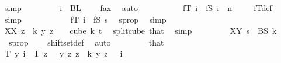 \begin{isabellebody}
\ simp\isanewline
\ \ \ \ \ \ \ \isamarkupfalse%
\ {\isachardoublequoteopen}i\ {\isasymnotin}\ BL\ {}{\isachardoublequoteclose}\ \isamarkupfalse%
\ {}\ fax{}\ \isamarkupfalse%
\ auto\isanewline
\ \ \ \ \ \ \ \isamarkupfalse%
\ \isamarkupfalse%
\ {\isachardoublequoteopen}fT\ i\ {\isacharequal}{\kern0pt}\ fS\ {\isacharparenleft}{\kern0pt}i\ {\isacharminus}{\kern0pt}\ n{\isacharparenright}{\kern0pt}{\isachardoublequoteclose}\ \isamarkupfalse%
\ {}\ \isamarkupfalse%
\ fT{\isacharunderscore}{\kern0pt}def\ \isamarkupfalse%
\ simp\isanewline
\ \ \ \ \ \ \ \isamarkupfalse%
\ \isamarkupfalse%
\ {\isacharasterisk}{\kern0pt}{\isacharasterisk}{\kern0pt}{\isacharcolon}{\kern0pt}\ {\isachardoublequoteopen}fT\ i\ {\isacharequal}{\kern0pt}\ fS\ s{\isachardoublequoteclose}\ \isamarkupfalse%
\ s{\isacharunderscore}{\kern0pt}prop\ \isamarkupfalse%
\ simp\isanewline
\isanewline
\ \ \ \ \ \ \ \isamarkupfalse%
\ XX{\isacharcolon}{\kern0pt}\ {\isachardoublequoteopen}{\isacharparenleft}{\kern0pt}{\isasymlambda}z\ {\isasymin}\ {\isacharbraceleft}{\kern0pt}{\isachardot}{\kern0pt}{\isachardot}{\kern0pt}{\isacharless}{\kern0pt}k{\isacharbraceright}{\kern0pt}{\isachardot}{\kern0pt}\ y\ {\isacharparenleft}{\kern0pt}z\ {\isacharplus}{\kern0pt}\ {}{\isacharparenright}{\kern0pt}{\isacharparenright}{\kern0pt}\ {\isasymin}\ cube\ k\ {\isacharparenleft}{\kern0pt}t{\isacharplus}{\kern0pt}{}{\isacharparenright}{\kern0pt}{\isachardoublequoteclose}\ \isamarkupfalse%
\ split{\isacharunderscore}{\kern0pt}cube\ that\ \isamarkupfalse%
\ simp\isanewline
\ \ \ \ \ \ \ \isamarkupfalse%
\ XY{\isacharcolon}{\kern0pt}\ {\isachardoublequoteopen}s\ {\isasymin}\ BS\ k{\isachardoublequoteclose}\ \isamarkupfalse%
\ \ s{\isacharunderscore}{\kern0pt}prop\ \ {}\ \isamarkupfalse%
\ shiftset{\isacharunderscore}{\kern0pt}def\ \isamarkupfalse%
\ auto\isanewline
\isanewline
\ \ \ \ \ \ \ \isamarkupfalse%
\ that\ \isamarkupfalse%
\ {\isachardoublequoteopen}T\ y\ i\ {\isacharequal}{\kern0pt}\ {\isacharparenleft}{\kern0pt}T{\isacharprime}{\kern0pt}\ {\isacharparenleft}{\kern0pt}{\isasymlambda}z\ {\isasymin}\ {\isacharbraceleft}{\kern0pt}{\isachardot}{\kern0pt}{\isachardot}{\kern0pt}{\isacharless}{\kern0pt}{}{\isacharbraceright}{\kern0pt}{\isachardot}{\kern0pt}\ y\ z{\isacharparenright}{\kern0pt}\ {\isacharparenleft}{\kern0pt}{\isasymlambda}z\ {\isasymin}\ {\isacharbraceleft}{\kern0pt}{\isachardot}{\kern0pt}{\isachardot}{\kern0pt}{\isacharless}{\kern0pt}k{\isacharbraceright}{\kern0pt}{\isachardot}{\kern0pt}\ y\ {\isacharparenleft}{\kern0pt}z\ {\isacharplus}{\kern0pt}\ {}{\isacharparenright}{\kern0pt}{\isacharparenright}{\kern0pt}{\isacharparenright}{\kern0pt}\ i{\isachardoublequoteclose}\ \isamarkupfalse%

\end{isabellebody}
